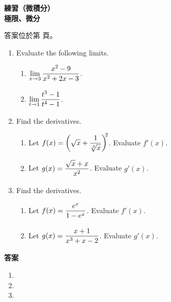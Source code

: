 \documentclass[10pt]{article}
\newcommand*{\fraction}[2]{\rule[-.8\baselineskip]{0pt}{2\baselineskip}\dfrac{#1}{#2}}
\renewcommand*{\maketitle}{{%
  \bfseries
  \LARGE 練習（微積分） \\
  \large 極限、微分 \par
}}
\begin{document}
\maketitle
\medskip
答案位於第 \pageref{answer} 頁。
\begin{enumerate}[label=\arabic*.,align=left,leftmargin=*,labelsep=.5em]
  \item Evaluate the following limits.
  \begin{enumerate}[label=(\alph*),left=0pt]
    \item $\lim\limits_{x \to 3}\fraction{x^2-9}{x^2+2x-3}$.
    \item $\lim\limits_{t \to 1} \fraction{t^3-1}{t^4-1}$.
  \end{enumerate}
  \item Find the derivatives.
  \begin{enumerate}[label=(\alph*),left=0pt]
    \item Let $f(x) = \biggl(\sqrt{x} + \fraction{1}{\sqrt[3]{x}}\biggr)^{\!\!2}$. Evaluate $f'(x)$.
    \item Let $g(x) = \fraction{\sqrt{x}+x}{x^2}$. Evaluate $g'(x)$.
  \end{enumerate}
  \item Find the derivatives.
  \begin{enumerate}[label=(\alph*),left=0pt]
    \item Let $f(x) = \fraction{e^x}{1-e^x}$. Evaluate $f'(x)$.
    \item Let $g(x) = \fraction{x+1}{x^3+x-2}$. Evaluate $g'(x)$.
  \end{enumerate}
\end{enumerate}

\newpage
\label{answer}
{\bfseries\large 答案 \par}
\begin{enumerate}[label=\arabic*.,align=left,leftmargin=*,labelsep=.3em]
  \item
  \item
  \item
\end{enumerate}
\end{document}
